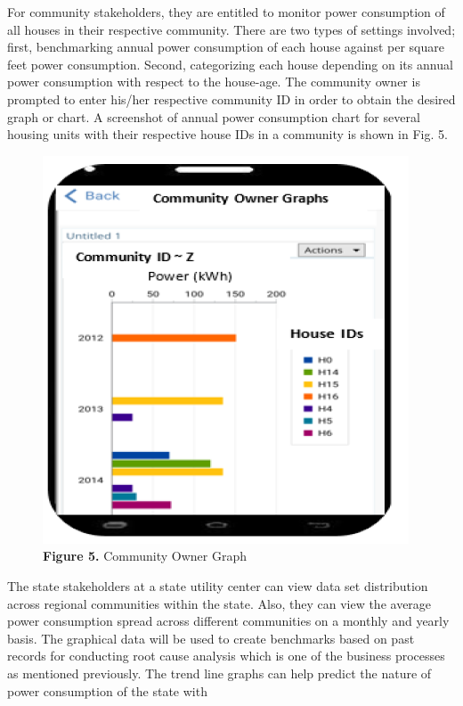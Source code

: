 \documentclass[a4paper,12pt,oneside]{article}
\let\counterwithin\relax
\begin{document}
\begin{itemize}
\begin{figure}[H]
    \end{figure}
    \newpage
    For community stakeholders, they are entitled to
    monitor power consumption of all houses in their respective
    community. There are two types of settings involved; first,
    benchmarking annual power consumption of each house
    against per square feet power consumption. Second,
    categorizing each house depending on its annual power
    consumption with respect to the house-age. The community
    owner is prompted to enter his/her respective community ID in
    order to obtain the desired graph or chart. A screenshot of
    annual power consumption chart for several housing units
    with their respective house IDs in a community is shown in
    Fig. 5.
        \begin{figure}[H]
        \includegraphics{Figure5.png}
        \centering
        \caption{\textbf{Figure 5.} Community Owner Graph}
        \end{figure}
        \newpage
    The state stakeholders at a state utility center can view data set distribution across
    regional communities within the state. Also, they can view the
    average power consumption spread across different
    communities on a monthly and yearly basis. The graphical
    data will be used to create benchmarks based on past records
    for conducting root cause analysis which is one of the business
    processes as mentioned previously. The trend line graphs can
    help predict the nature of power consumption of the state with

\end{itemize}
\end{document}

